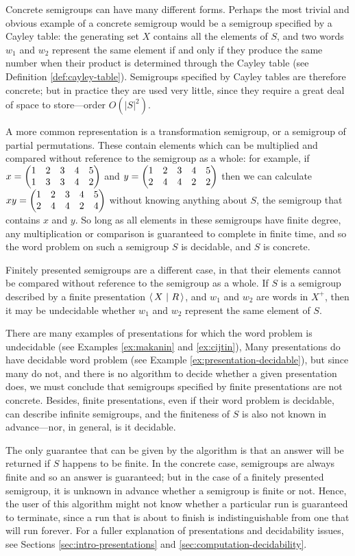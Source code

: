 Concrete semigroups can have many different forms.  Perhaps the most trivial and
obvious example of a concrete semigroup would be a semigroup specified by a
Cayley table: the generating set $X$ contains all the elements of $S$, and two
words $w_1$ and $w_2$ represent the same element if and only if they produce the
same number when their product is determined through the Cayley table (see
Definition \ref{def:cayley-table}).  Semigroups specified by
Cayley tables are therefore concrete; but in practice they are used very little,
since they require a great deal of space to store---order $O(|S|^2)$.

A more common representation is a transformation semigroup, or a semigroup of
partial permutations.  These contain elements which can be multiplied and
compared without reference to the semigroup as a whole: for example, if
$x = \begin{pmatrix} 1 & 2 & 3 & 4 & 5 \\ 1 & 3 & 3 & 4 & 2 \end{pmatrix}$ and $y = \begin{pmatrix} 1 & 2 & 3 & 4 & 5 \\ 2 & 4 & 4 & 2 & 2 \end{pmatrix}$ then we can calculate
$xy = \begin{pmatrix} 1 & 2 & 3 & 4 & 5 \\ 2 & 4 & 4 & 2 & 4 \end{pmatrix}$ without knowing anything about $S$, the semigroup that
contains $x$ and $y$.  So long as all elements in these semigroups have finite
degree, any multiplication or comparison is guaranteed to complete in finite
time, and so the word problem on such a semigroup $S$ is decidable, and $S$ is
concrete.

Finitely presented semigroups are a different case, in that their elements
cannot be compared without reference to the semigroup as a whole.  If $S$ is a
semigroup described by a finite presentation $\left\langle\,X ~\middle|~ R\,\right\rangle$, and $w_1$ and $w_2$
are words in $X^+$, then it may be undecidable whether $w_1$ and $w_2$ represent
the same element of $S$.

There are many examples of presentations for which the word problem is
undecidable (see Examples \ref{ex:makanin} and \ref{ex:cijtin}), Many
presentations do have decidable word problem (see Example
\ref{ex:presentation-decidable}), but since many do not, and there is no algorithm
to decide whether a given presentation does, we must conclude that semigroups
specified by finite presentations are not concrete.  Besides, finite
presentations, even if their word problem is decidable, can describe infinite
semigroups, and the finiteness of $S$ is also not known in advance---nor, in
general, is it decidable.

The only guarantee that can be given by the algorithm is that an answer will be
returned if $S$ happens to be finite.  In the concrete case, semigroups are
always finite and so an answer is guaranteed; but in the case of a finitely
presented semigroup, it is unknown in advance whether a semigroup is finite or
not.  Hence, the user of this algorithm might not know whether a particular run
is guaranteed to terminate, since a run that is about to finish is
indistinguishable from one that will run forever.  For a fuller explanation of
presentations and decidability issues, see Sections
\ref{sec:intro-presentations} and \ref{sec:computation-decidability}.


